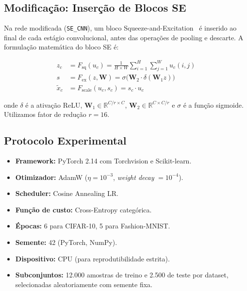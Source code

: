 \documentclass[runningheads]{llncs}
\begin{document}
\subsection{Modificação: Inserção de Blocos SE}

Na rede modificada (\texttt{SE\_CNN}), um bloco
Squeeze-and-Excitation~\cite{ref_senet} é inserido ao final de cada
estágio convolucional, antes das operações de pooling e descarte. A
formulação matemática do bloco SE é:

\begin{align}
  z_c &= F_{\text{sq}}(u_c)
    = \frac{1}{H \times W} \sum_{i=1}^{H} \sum_{j=1}^{W} u_c(i,j)
    \label{eq:squeeze} \\
  s   &= F_{\text{ex}}(z, \mathbf{W})
    = \sigma\!\bigl(\mathbf{W}_2 \cdot \delta(\mathbf{W}_1 z)\bigr)
    \label{eq:excitation} \\
  \tilde{x}_c &= F_{\text{scale}}(u_c, s_c) = s_c \cdot u_c
    \label{eq:scale}
\end{align}

\noindent onde $\delta$ é a ativação ReLU,
$\mathbf{W}_1 \in \mathbb{R}^{C/r \times C}$,
$\mathbf{W}_2 \in \mathbb{R}^{C \times C/r}$ e $\sigma$ é a função
sigmoide. Utilizamos fator de redução $r = 16$.

\subsection{Protocolo Experimental}

\begin{itemize}
  \item \textbf{Framework:} PyTorch 2.14 com Torchvision e Scikit-learn.
  \item \textbf{Otimizador:} AdamW ($\eta = 10^{-3}$,
    \textit{weight decay} $= 10^{-4}$).
  \item \textbf{Scheduler:} Cosine Annealing LR.
  \item \textbf{Função de custo:} Cross-Entropy categórica.
  \item \textbf{Épocas:} 6 para CIFAR-10, 5 para Fashion-MNIST.
  \item \textbf{Semente:} 42 (PyTorch, NumPy).
  \item \textbf{Dispositivo:} CPU (para reprodutibilidade estrita).
  \item \textbf{Subconjuntos:} 12.000 amostras de treino e 2.500 de
    teste por dataset, selecionadas aleatoriamente com semente fixa.
\end{itemize}
\end{document}
